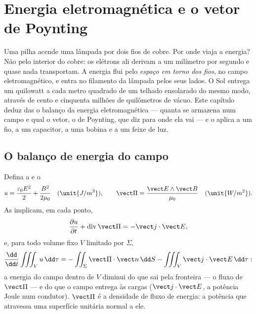 \chapter{Energia eletromagnética e o vetor de Poynting}\label{ch:b2:poynting-vector}

Uma pilha acende uma lâmpada por dois fios de cobre. Por onde viaja a
energia? Não pelo interior do cobre: os elétrons ali
derivam a um milímetro por segundo e quase nada transportam. A
energia flui pelo \emph{espaço em torno dos fios}, no campo
eletromagnético, e entra no filamento da lâmpada pelos seus
lados. O Sol entrega um quilowatt a cada metro quadrado de um telhado
ensolarado do mesmo modo, através de cento e cinquenta milhões de quilômetros de
vácuo. Este capítulo deduz das  o balanço
da energia eletromagnética --- quanta se armazena num campo e
qual o vetor, o de Poynting, que diz para onde ela vai --- e o aplica a um
fio, a um capacitor, a uma bobina e a um feixe de luz.

\section{O balanço de energia do campo}

\begin{theorem}\label{thm:b2:poynting-vector:poynting}
Defina a \emph{} e o \emph{}
\[
u = \frac{\varepsilon_0E^2}2 + \frac{B^2}{2\mu_0} \quad (\unit{J/m^3}) , \qquad
\vect\Pi = \frac{\vect E\wedge\vect B}{\mu_0} \quad (\unit{W/m^2}) .
\]
As  implicam, em cada ponto,
\[
\frac{\partial u}{\partial t} + \operatorname{div}\vect\Pi = -\vect j\cdot\vect E ,
\]
e, para todo volume fixo $V$ limitado por $\Sigma$,
\[
\frac{\dd}{\dd t}\iiint_Vu\,\dd\tau = -\iint_\Sigma\vect\Pi\cdot\vect n\,\dd S - \iiint_V\vect j\cdot\vect E\,\dd\tau :
\]
a energia do campo dentro de $V$ diminui do que sai pela
fronteira --- o fluxo de $\vect\Pi$ --- e do que o campo entrega às
cargas ($\vect j\cdot\vect E$, a potência Joule num condutor). $\vect\Pi$
é a densidade de fluxo de energia: a potência que atravessa uma superfície unitária
normal a ele.
\end{theorem}

